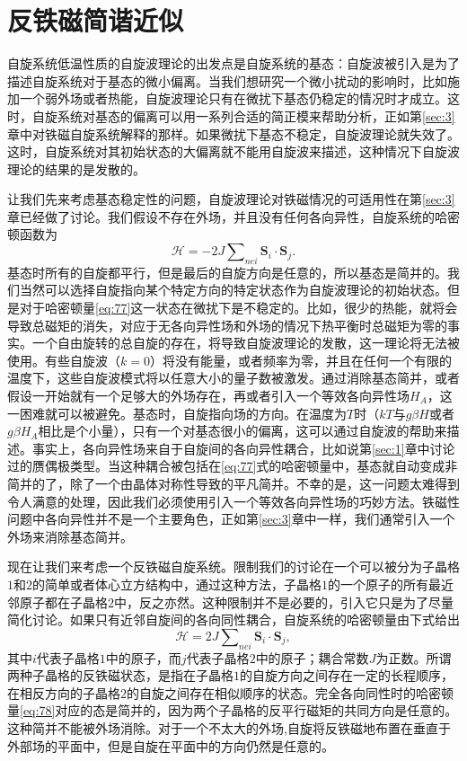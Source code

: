 \documentclass{article}
\begin{document}
\section{反铁磁简谐近似} \label{sec:7}

自旋系统低温性质的自旋波理论的出发点是自旋系统的基态：自旋波被引入是为了描述自旋系统对于基态的微小偏离。当我们想研究一个微小扰动的影响时，比如施加一个弱外场或者热能，自旋波理论只有在微扰下基态仍稳定的情况时才成立。这时，自旋系统对基态的偏离可以用一系列合适的简正模来帮助分析，正如第\ref{sec:3}章中对铁磁自旋系统解释的那样。如果微扰下基态不稳定，自旋波理论就失效了。这时，自旋系统对其初始状态的大偏离就不能用自旋波来描述，这种情况下自旋波理论的结果的是发散的。

让我们先来考虑基态稳定性的问题，自旋波理论对铁磁情况的可适用性在第\ref{sec:3}章已经做了讨论。我们假设不存在外场，并且没有任何各向异性，自旋系统的哈密顿函数为
\begin{equation} \label{eq:77}
\mathcal{H}=-2J\sum\nolimits_{\textit{nei}}\mathbf{S}_i\cdot\mathbf{S}_j.
\end{equation} 
基态时所有的自旋都平行，但是最后的自旋方向是任意的，所以基态是简并的。我们当然可以选择自旋指向某个特定方向的特定状态作为自旋波理论的初始状态。但是对于哈密顿量\eqref{eq:77}这一状态在微扰下是不稳定的。比如，很少的热能，就将会导致总磁矩的消失，对应于无各向异性场和外场的情况下热平衡时总磁矩为零的事实。一个自由旋转的总自旋的存在，将导致自旋波理论的发散，这一理论将无法被使用。有些自旋波（$k=0$）将没有能量，或者频率为零，并且在任何一个有限的温度下，这些自旋波模式将以任意大小的量子数被激发。通过消除基态简并，或者假设一开始就有一个足够大的外场存在，再或者引入一个等效各向异性场$H_A$，这一困难就可以被避免。基态时，自旋指向场的方向。在温度为$T$时（$kT$与$g\beta H$或者$g\beta H_A$相比是个小量），只有一个对基态很小的偏离，这可以通过自旋波的帮助来描述。事实上，各向异性场来自于自旋间的各向异性耦合，比如说第\ref{sec:1}章中讨论过的赝偶极类型。当这种耦合被包括在\eqref{eq:77}式的哈密顿量中，基态就自动变成非简并的了，除了一个由晶体对称性导致的平凡简并。不幸的是，这一问题太难得到令人满意的处理，因此我们必须使用引入一个等效各向异性场的巧妙方法。铁磁性问题中各向异性并不是一个主要角色，正如第\ref{sec:3}章中一样，我们通常引入一个外场来消除基态简并。


现在让我们来考虑一个反铁磁自旋系统。限制我们的讨论在一个可以被分为子晶格$1$和$2$的简单或者体心立方结构中，通过这种方法，子晶格$1$的一个原子的所有最近邻原子都在子晶格$2$中，反之亦然。这种限制并不是必要的，引入它只是为了尽量简化讨论。如果只有近邻自旋间的各向同性耦合，自旋系统的哈密顿量由下式给出
\begin{equation} \label{eq:78}
\mathcal{H}=2J\sum\nolimits_{\mathit{nei}}\mathbf{S}_i\cdot\mathbf{S}_j,
\end{equation}
其中$i$代表子晶格$1$中的原子，而$j$代表子晶格$2$中的原子；耦合常数$J$为正数。所谓两种子晶格的反铁磁状态，是指在子晶格$1$的自旋方向之间存在一定的长程顺序，在相反方向的子晶格$2$的自旋之间存在相似顺序的状态。完全各向同性时的哈密顿量\eqref{eq:78}对应的态是简并的，因为两个子晶格的反平行磁矩的共同方向是任意的。这种简并不能被外场消除。对于一个不太大的外场,自旋将反铁磁地布置在垂直于外部场的平面中，但是自旋在平面中的方向仍然是任意的。
\end{document}
